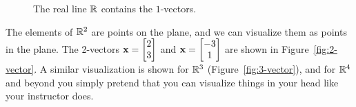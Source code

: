 \begin{figure}[b]
    \centering
    \caption{The real line $\mathbb{R}$ contains the $1$-vectors.}
    \label{fig:1-vector}
\end{figure}

The elements of $\mathbb{R}^2$ are points on the plane, and we can visualize them as points in the plane. The 2-vectors $\mf{x} = \bmxc 2 \\ 3 \emx$ and $\mf{x} = \bmxc -3 \\ 1 \emx$ are shown in Figure~\ref{fig:2-vector}. A similar visualization is shown for $\mathbb{R}^3$ (Figure~\ref{fig:3-vector}), and for $\mathbb{R}^4$ and beyond you simply pretend that you can visualize things in your head like your instructor does.

